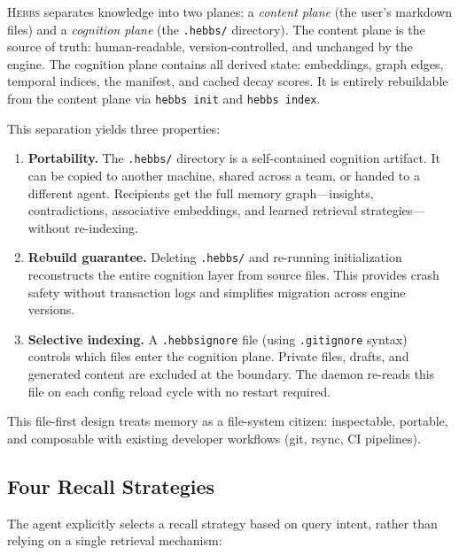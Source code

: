 \documentclass{article}
\begin{document}
\textsc{Hebbs} separates knowledge into two planes: a \emph{content plane} (the user's markdown files) and a \emph{cognition plane} (the \texttt{.hebbs/} directory). The content plane is the source of truth: human-readable, version-controlled, and unchanged by the engine. The cognition plane contains all derived state: embeddings, graph edges, temporal indices, the manifest, and cached decay scores. It is entirely rebuildable from the content plane via \texttt{hebbs init} and \texttt{hebbs index}.

This separation yields three properties:

\begin{enumerate}
    \item \textbf{Portability.} The \texttt{.hebbs/} directory is a self-contained cognition artifact. It can be copied to another machine, shared across a team, or handed to a different agent. Recipients get the full memory graph---insights, contradictions, associative embeddings, and learned retrieval strategies---without re-indexing.
    \item \textbf{Rebuild guarantee.} Deleting \texttt{.hebbs/} and re-running initialization reconstructs the entire cognition layer from source files. This provides crash safety without transaction logs and simplifies migration across engine versions.
    \item \textbf{Selective indexing.} A \texttt{.hebbsignore} file (using \texttt{.gitignore} syntax) controls which files enter the cognition plane. Private files, drafts, and generated content are excluded at the boundary. The daemon re-reads this file on each config reload cycle with no restart required.
\end{enumerate}

This file-first design treats memory as a file-system citizen: inspectable, portable, and composable with existing developer workflows (git, rsync, CI pipelines).

\subsection{Four Recall Strategies}
\label{sec:recall}

The agent explicitly selects a recall strategy based on query intent, rather than relying on a single retrieval mechanism:
\end{document}

